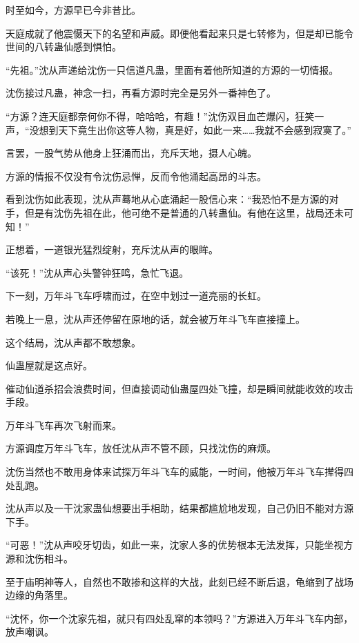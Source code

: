 
\begin{this_body}



时至如今，方源早已今非昔比。

天庭成就了他震慑天下的名望和声威。即便他看起来只是七转修为，但是却已能令世间的八转蛊仙感到惧怕。

“先祖。”沈从声递给沈伤一只信道凡蛊，里面有着他所知道的方源的一切情报。

沈伤接过凡蛊，神念一扫，再看方源时完全是另外一番神色了。

“方源？连天庭都奈何你不得，哈哈哈，有趣！”沈伤双目血芒爆闪，狂笑一声，“没想到天下竟生出你这等人物，真是好，如此一来……我就不会感到寂寞了。”

言罢，一股气势从他身上狂涌而出，充斥天地，摄人心魄。

方源的情报不仅没有令沈伤忌惮，反而令他涌起高昂的斗志。

看到沈伤如此表现，沈从声蓦地从心底涌起一股信心来：“我恐怕不是方源的对手，但是有沈伤先祖在此，他可绝不是普通的八转蛊仙。有他在这里，战局还未可知！”

正想着，一道银光猛烈绽射，充斥沈从声的眼眸。

“该死！”沈从声心头警钟狂鸣，急忙飞退。

下一刻，万年斗飞车呼啸而过，在空中划过一道亮丽的长虹。

若晚上一息，沈从声还停留在原地的话，就会被万年斗飞车直接撞上。

这个结局，沈从声都不敢想象。

仙蛊屋就是这点好。

催动仙道杀招会浪费时间，但直接调动仙蛊屋四处飞撞，却是瞬间就能收效的攻击手段。

万年斗飞车再次飞射而来。

方源调度万年斗飞车，放任沈从声不管不顾，只找沈伤的麻烦。

沈伤当然也不敢用身体来试探万年斗飞车的威能，一时间，他被万年斗飞车撵得四处乱跑。

沈从声以及一干沈家蛊仙想要出手相助，结果都尴尬地发现，自己仍旧不能对方源下手。

“可恶！”沈从声咬牙切齿，如此一来，沈家人多的优势根本无法发挥，只能坐视方源和沈伤相斗。

至于庙明神等人，自然也不敢掺和这样的大战，此刻已经不断后退，龟缩到了战场边缘的角落里。

“沈怀，你一个沈家先祖，就只有四处乱窜的本领吗？”方源进入万年斗飞车内部，放声嘲讽。


\end{this_body}
